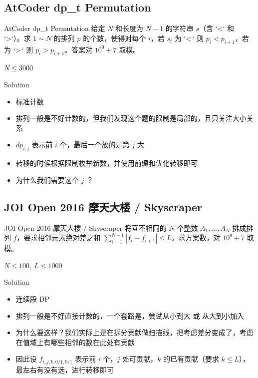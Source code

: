 ﻿\documentclass[aspectratio=169]{ctexbeamer}
\begin{document}
\subsection{AtCoder dp\_t Permutation}
\begin{frame}{AtCoder dp\_t Permutation}
    给定 $N$ 和长度为 $N-1$ 的字符串 $s$（含 `<` 和 `>`）。求 $1\sim N$ 的排列 $p$ 的个数，使得对每个 $i$，若 $s_i$ 为 `<$\,$` 则 $p_i<p_{i+1}$，若为 `>$\,$` 则 $p_i>p_{i+1}$。答案对 $10^9+7$ 取模。
    
    $N\le 3000$
\end{frame}


\begin{frame}{Solution}
    \begin{itemize}
        \item 标准计数
        \item 排列一般是不好计数的，但我们发现这个题的限制是局部的，且只关注大小关系
        \item $dp_{i,j}$ 表示前 $i$ 个，最后一个放的是第 $j$ 大
        \item 转移的时候根据限制枚举新数，并使用前缀和优化转移即可
        \item 为什么我们需要这个 $j$ ？
    \end{itemize}
\end{frame}

\subsection{JOI Open 2016 摩天大楼 / Skyscraper}
\begin{frame}{JOI Open 2016 摩天大楼 / Skyscraper}
    将互不相同的 $N$ 个整数 $A_1,\dots,A_N$ 排成排列 $f$，要求相邻元素绝对差之和 $\displaystyle\sum_{i=1}^{N-1}|f_i-f_{i+1}|\le L$。求方案数，对 $10^9+7$ 取模。
    
    $N\le 100,\ L\le 1000$
\end{frame}

\begin{frame}{Solution}
    \begin{itemize}
        \item 连续段 DP
        \item 排列一般是不好直接计数的，一个套路是，尝试从小到大 或 从大到小加入
        \item 为什么要这样？我们实际上是在拆分贡献做扫描线，把考虑差分变成了，考虑在值域上有哪些相邻的数在此处有贡献
        \item 因此设 $f_{i,j,k,0/1,0/1}$ 表示前 $i$ 个，$j$ 处可贡献，$k$ 的已有贡献（要求 $k\le L$），最左右有没有选，进行转移即可 
    \end{itemize}
\end{frame}
\end{document}
